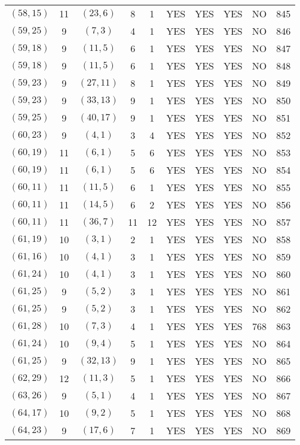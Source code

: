 \begin{longtable}{|c|c|c|c|c|c|c|c|c|c|}
$(58, 15)$ & 11 & $(23, 6)$ & 8 & 1 & YES & YES & YES & NO & 845\\
$(59, 25)$ & 9 & $(7, 3)$ & 4 & 1 & YES & YES & YES & NO & 846\\
$(59, 18)$ & 9 & $(11, 5)$ & 6 & 1 & YES & YES & YES & NO & 847\\
$(59, 18)$ & 9 & $(11, 5)$ & 6 & 1 & YES & YES & YES & NO & 848\\
$(59, 23)$ & 9 & $(27, 11)$ & 8 & 1 & YES & YES & YES & NO & 849\\
$(59, 23)$ & 9 & $(33, 13)$ & 9 & 1 & YES & YES & YES & NO & 850\\
$(59, 25)$ & 9 & $(40, 17)$ & 9 & 1 & YES & YES & YES & NO & 851\\
$(60, 23)$ & 9 & $(4, 1)$ & 3 & 4 & YES & YES & YES & NO & 852\\
$(60, 19)$ & 11 & $(6, 1)$ & 5 & 6 & YES & YES & YES & NO & 853\\
$(60, 19)$ & 11 & $(6, 1)$ & 5 & 6 & YES & YES & YES & NO & 854\\
$(60, 11)$ & 11 & $(11, 5)$ & 6 & 1 & YES & YES & YES & NO & 855\\
$(60, 11)$ & 11 & $(14, 5)$ & 6 & 2 & YES & YES & YES & NO & 856\\
$(60, 11)$ & 11 & $(36, 7)$ & 11 & 12 & YES & YES & YES & NO & 857\\
$(61, 19)$ & 10 & $(3, 1)$ & 2 & 1 & YES & YES & YES & NO & 858\\
$(61, 16)$ & 10 & $(4, 1)$ & 3 & 1 & YES & YES & YES & NO & 859\\
$(61, 24)$ & 10 & $(4, 1)$ & 3 & 1 & YES & YES & YES & NO & 860\\
$(61, 25)$ & 9 & $(5, 2)$ & 3 & 1 & YES & YES & YES & NO & 861\\
$(61, 25)$ & 9 & $(5, 2)$ & 3 & 1 & YES & YES & YES & NO & 862\\
$(61, 28)$ & 10 & $(7, 3)$ & 4 & 1 & YES & YES & YES & 768 & 863\\
$(61, 24)$ & 10 & $(9, 4)$ & 5 & 1 & YES & YES & YES & NO & 864\\
$(61, 25)$ & 9 & $(32, 13)$ & 9 & 1 & YES & YES & YES & NO & 865\\
$(62, 29)$ & 12 & $(11, 3)$ & 5 & 1 & YES & YES & YES & NO & 866\\
$(63, 26)$ & 9 & $(5, 1)$ & 4 & 1 & YES & YES & YES & NO & 867\\
$(64, 17)$ & 10 & $(9, 2)$ & 5 & 1 & YES & YES & YES & NO & 868\\
$(64, 23)$ & 9 & $(17, 6)$ & 7 & 1 & YES & YES & YES & NO & 869\\

\end{longtable}
